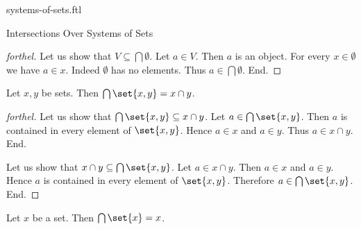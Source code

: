 \documentclass{naproche-library}
\begin{document}
\begin{smodule}[title=Systems of Sets]{systems-of-sets.ftl}
\begin{sfragment}{Intersections Over Systems of Sets}
\begin{proof}[forthel]
    Let us show that $V \subseteq \bigcap \emptyset$.
      Let $a \in V$.
      Then $a$ is an object.
      For every $x \in \emptyset$ we have $a \in x$.
      Indeed $\emptyset$ has no elements.
      Thus $a \in \bigcap \emptyset$.
    End.
  \end{proof}

  \begin{proposition}[forthel,id=FOUNDATIONS_10_7851827447988224]
    Let $x, y$ be sets.
    Then $\bigcap \set{x, y} = x \cap y$.
  \end{proposition}
  \begin{proof}[forthel]
    Let us show that $\bigcap \set{x, y} \subseteq x \cap y$.
      Let $a \in \bigcap \set{x, y}$.
      Then $a$ is contained in every element of $\set{x, y}$.
      Hence $a \in x$ and $a \in y$.
      Thus $a \in x \cap y$.
    End.

    Let us show that $x \cap y \subseteq \bigcap \set{x, y}$.
      Let $a \in x \cap y$.
      Then $a \in x$ and $a \in y$.
      Hence $a$ is contained in every element of $\set{x, y}$.
      Therefore $a \in \bigcap \set{x, y}$.
    End.
  \end{proof}

  \begin{corollary}[forthel,id=FOUNDATIONS_10_7239895674257408]
    Let $x$ be a set.
    Then $\bigcap \set{x} = x$.
  \end{corollary}
\end{sfragment}
\end{smodule}
\end{document}
